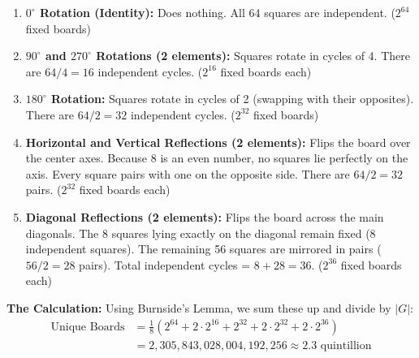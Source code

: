 \documentclass[12pt]{article}
\begin{document}
\begin{enumerate}
    \item \textbf{$0^\circ$ Rotation (Identity):} Does nothing. All 64 squares are independent. ($2^{64}$ fixed boards)

    \item \textbf{$90^\circ$ and $270^\circ$ Rotations (2 elements):} Squares rotate in cycles of 4. There are $64 / 4 = 16$ independent cycles. ($2^{16}$ fixed boards each)

    \item \textbf{$180^\circ$ Rotation:} Squares rotate in cycles of 2 (swapping with their opposites). There are $64 / 2 = 32$ independent cycles. ($2^{32}$ fixed boards)

    \item \textbf{Horizontal and Vertical Reflections (2 elements):} Flips the board over the center axes. Because 8 is an even number, no squares lie perfectly on the axis. Every square pairs with one on the opposite side. There are $64 / 2 = 32$ pairs. ($2^{32}$ fixed boards each)

    \item \textbf{Diagonal Reflections (2 elements):} Flips the board across the main diagonals. The 8 squares lying exactly on the diagonal remain fixed (8 independent squares). The remaining 56 squares are mirrored in pairs ($56 / 2 = 28$ pairs). Total independent cycles = $8 + 28 = 36$. ($2^{36}$ fixed boards each)
\end{enumerate}

\textbf{The Calculation:}
Using Burnside's Lemma, we sum these up and divide by $|G|$:
\begin{align*}
    \text{Unique Boards} & = \frac{1}{8} \left( 2^{64} + 2 \cdot 2^{16} + 2^{32} + 2 \cdot 2^{32} + 2 \cdot 2^{36} \right) \\
                         & = 2,305,843,028,004,192,256 \approx{2.3 \text{ quintillion}}
\end{align*}
\end{document}
